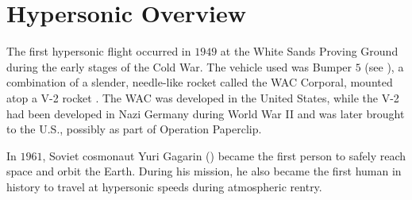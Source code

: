 \section{Hypersonic Overview\label{ch2:hypersonicOverview}}
    The first hypersonic flight occurred in $1949$ at the White Sands Proving
    Ground during the early stages of the Cold War. The vehicle used was Bumper
    $5$ (see ), a combination of a slender, needle-like rocket
    called the WAC Corporal, mounted atop a V-2 rocket \cite{Anderson2022}. The
    WAC was developed in the United States, while the V-2 had been developed in
    Nazi Germany during World War II and was later brought to the U.S.,
    possibly as part of Operation Paperclip. 

    In $1961$, Soviet cosmonaut Yuri Gagarin () became
    the first person to safely reach space and orbit the Earth. During his
    mission, he also became the first human in history to travel at hypersonic
    speeds \cite{Anderson2022} during atmospheric rentry.

